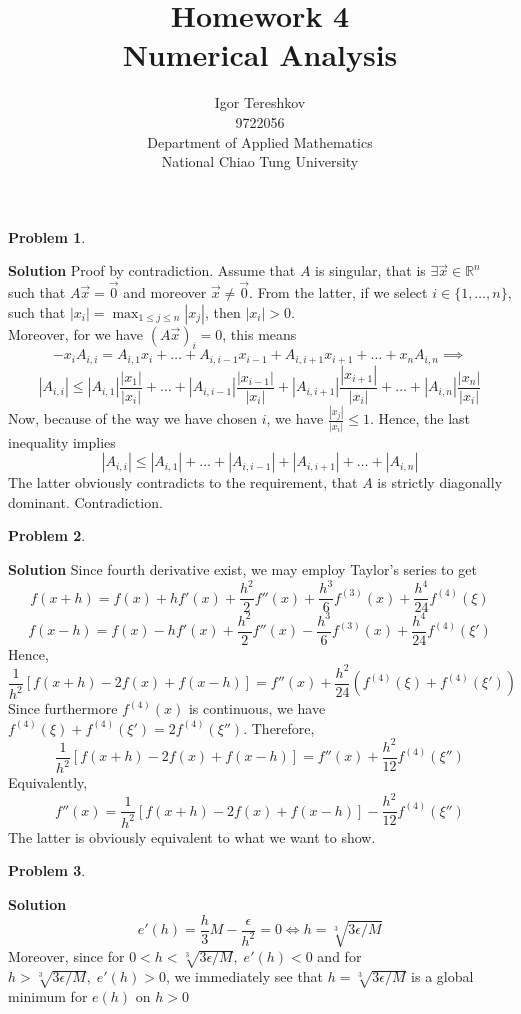 \documentclass[8pt]{article} %
\title{Homework 4\\
Numerical Analysis}
\author{Igor Tereshkov\\9722056\\Department of Applied Mathematics\\National Chiao Tung University}
\newtheorem{prob}{Problem}
\newenvironment{solution}%
{\par\textbf{Solution}\space }%
{\par}
\begin{document}
\begin{CJK}{UTF8}{bsmi}
\maketitle
\end{CJK}

\newcommand{\poo}[1]{\ensuremath{\frac{|x_{#1}|}{|x_i|}}}

\begin{prob}\end{prob}
\begin{solution}
	Proof by contradiction. Assume that $A$ is singular, that is $\exists \vec{x}\in\mathbb{R}^n$ such that $A\vec{x}=\vec{0}$ and moreover
	$\vec{x}\neq\vec{0}$. From the latter, if we select $i\in\{1,\dots,n\}$, such that $|x_i|=\max_{1\leq j\leq n}|x_j|$, then $|x_i|>0$.\\
	Moreover, for we have $(A\vec{x})_i=0$, this means
	\[-x_iA_{i,i}=A_{i,1}x_i+\dots+A_{i,i-1}x_{i-1}+A_{i,i+1}x_{i+1}+\dots+x_nA_{i,n}\implies\]
	\[|A_{i,i}|\leq |A_{i,1}|\poo{1}+\dots+|A_{i,i-1}|\poo{i-1}+|A_{i,i+1}|\poo{i+1}+\dots+|A_{i,n}|\poo{n}\]
	Now, because of the way we have chosen $i$, we have $\poo{j}\leq 1$. Hence, the last inequality implies
	\[|A_{i,i}|\leq |A_{i,1}|+\dots+|A_{i,i-1}|+|A_{i,i+1}|+\dots+|A_{i,n}|\]
	The latter obviously contradicts to the requirement, that $A$ is strictly diagonally dominant. Contradiction.
\end{solution}
\begin{prob}\end{prob}
\begin{solution}
	Since fourth derivative exist, we may employ Taylor's series to get
	\[f(x+h)=f(x)+hf'(x)+\frac{h^2}{2}f''(x)+\frac{h^3}{6}f^{(3)}(x)+\frac{h^4}{24}f^{(4)}(\xi)\]
	\[f(x-h)=f(x)-hf'(x)+\frac{h^2}{2}f''(x)-\frac{h^3}{6}f^{(3)}(x)+\frac{h^4}{24}f^{(4)}(\xi')\]
	Hence,
	\[\frac{1}{h^2}[f(x+h)-2f(x)+f(x-h)]=f''(x)+\frac{h^2}{24}(f^{(4)}(\xi)+f^{(4)}(\xi'))\]
	Since furthermore $f^{(4)}(x)$ is continuous, we have $f^{(4)}(\xi)+f^{(4)}(\xi')=2f^{(4)}(\xi'')$. Therefore,
	\[\frac{1}{h^2}[f(x+h)-2f(x)+f(x-h)]=f''(x)+\frac{h^2}{12}f^{(4)}(\xi'')\]
	Equivalently,
	\[f''(x)=\frac{1}{h^2}[f(x+h)-2f(x)+f(x-h)]-\frac{h^2}{12}f^{(4)}(\xi'')\]
	The latter is obviously equivalent to what we want to show.
\end{solution}
\begin{prob}\end{prob}
\begin{solution}
	\[e'(h)=\frac{h}{3}M-\frac{\epsilon}{h^2}=0\iff h=\sqrt[3]{3\epsilon/M}\]
	Moreover, since for $0<h<\sqrt[3]{3\epsilon/M},\;e'(h)<0$ and for $h>\sqrt[3]{3\epsilon/M},\;e'(h)>0$, we immediately see
	that $h=\sqrt[3]{3\epsilon/M}$ is a global minimum for $e(h)$ on $h>0$
\end{solution}
\end{document}
